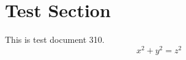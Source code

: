 \documentclass{article}
\begin{document}
\section{Test Section}
This is test document 310.
\begin{equation}
x^2 + y^2 = z^2
\end{equation}
\end{document}
